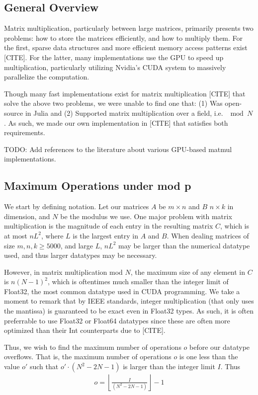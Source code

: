 
\subsection{General Overview}

Matrix multiplication, particularly between large matrices, primarily presents two problems: how to store the matrices efficiently, and how to multiply them. For the first, sparse data structures and more efficient memory access patterns exist [CITE]. For the latter, many implementations use the GPU to speed up multiplication, particularly utilizing Nvidia's CUDA system to massively parallelize the computation.

Though many fast implementations exist for matrix multiplication [CITE] that solve the above two problems, we were unable to find one that: (1) Was open-source in Julia and (2) Supported matrix multiplication over a field, i.e. $\mod N$. As such, we made our own implementation in [CITE] that satisfies both requirements.

TODO: Add references to the literature about various GPU-based matmul implementations.

\subsection{Maximum Operations under mod p}

We start by defining notation. Let our matrices $A$ be $m \times n$ and $B$ $n \times k$ in dimension, and $N$ be the modulus we use. One major problem with matrix multiplication is the magnitude of each entry in the resulting matrix $C$, which is at most $n L^2$, where $L$ is the largest entry in $A$ and $B$. When dealing matrices of size $m,n,k \geq 5000$, and large $L$, $n L^2$ may be larger than the numerical datatype used, and thus larger datatypes may be necessary.

However, in matrix multiplication mod $N$, the maximum size of any element in $C$ is $n (N-1)^2$, which is oftentimes much smaller than the integer limit of Float32, the most common datatype used in CUDA programming. We take a moment to remark that by IEEE standards, integer multiplication (that only uses the mantissa) is guaranteed to be exact even in Float32 types. As such, it is often preferrable to use Float32 or Float64 datatypes since these are often more optimized than their Int counterparts due to [CITE].

Thus, we wish to find the maximum number of operations $o$ before our datatype overflows. That is, the maximum number of operations $o$ is one less than the value $o'$ such that $o' \cdot (N^2 - 2N - 1)$ is larger than the integer limit $I$. Thus
\begin{align*}
    o = \left\lfloor \frac{I}{(N^2 - 2N - 1)} \right\rfloor - 1
\end{align*}


